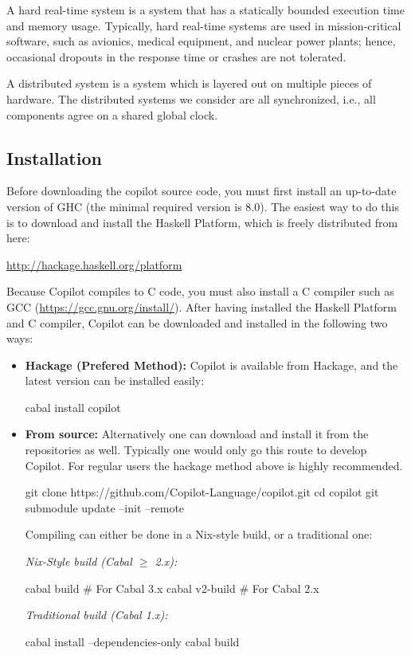 A hard real-time system is a system that has a statically bounded execution time
and memory usage.  Typically, hard real-time systems are used in
mission-critical software, such as avionics, medical equipment, and nuclear power
plants; hence, occasional dropouts in the response time or crashes are not
tolerated.

A distributed system is a system which is layered out on multiple pieces of hardware.
The distributed systems we consider are all synchronized, i.e., all components agree on
a shared global clock.


\subsection{Installation} \label{sec:install}

Before downloading the copilot source code, you must first install an
up-to-date version of GHC (the minimal required version is 8.0).
The easiest way to do this is to download and install the Haskell Platform,
which is freely distributed from here:

\begin{center}
\url{http://hackage.haskell.org/platform}
\end{center}

\noindent Because Copilot compiles to C code, you must also install a C compiler such as GCC (\url{https://gcc.gnu.org/install/}). After having installed the Haskell Platform and C compiler, Copilot can be downloaded and
installed in the following two ways:

\begin{itemize}
\item \textbf{Hackage (Prefered Method): } Copilot is available from Hackage,
and the latest version can be installed easily:
\begin{code}
cabal install copilot
\end{code}

\item \textbf{From source: } Alternatively one can download and install it from
the repositories as well. Typically one would only go this route to develop
Copilot. For regular users the hackage method above is highly recommended.
\begin{code}
git clone https://github.com/Copilot-Language/copilot.git
cd copilot
git submodule update --init --remote
\end{code}
Compiling can either be done in a Nix-style build, or a traditional one:

\noindent\emph{Nix-Style build (Cabal $\ge$ 2.x):}
\begin{code}
cabal build       # For Cabal 3.x
cabal v2-build    # For Cabal 2.x
\end{code}

\noindent\emph{Traditional build (Cabal 1.x):}
\begin{code}
cabal install --dependencies-only
cabal build
\end{code}
\end{itemize}

